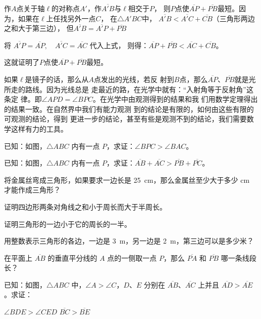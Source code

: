 \begin{solution}
    作$A$点关于轴$\ell$的对称点$A'$，作$\overline{A'B}$与$\ell$相交于$P$，
    则$P$点使$\overline{AP}+\overline{PB}$最短。因为，如果在$\ell$上任找另外一点$C$，
    在$\triangle A'BC$中，
    $\overline{A'B}<\overline{A'C}+\overline{CB}$（三角形两边之和大于第三边），
    但$\overline{A'B}=\overline{A'P}+\overline{PB}$

将    $\overline{A'P}=\overline{AP},\quad \overline{A'C}=\overline{AC}$ 代入上式，
    则得：$\overline{AP}+\overline{PB}<\overline{AC}+\overline{CB}$。

    这就证明了$P$点使$\overline{AP}+\overline{PB}$最短。
\end{solution}

\begin{rmk}
    如果$\ell$是镜子的话，那么从$A$点发出的光线，若反
射到$B$点，那么$\overline{AP}$、$\overline{PB}$就是光所走的路线。因为光线总是
走最近的路，在光学中就有：“入射角等于反射角”这条定
律。即$\angle APD=\angle BPC$。在光学中由观测得到的结果和我
们用数学定理得出的结果一致。在自然界中我们有能力观测
到的结论是有限的，如何由这些有限的可观测的结论，得到
更进一步的结论，甚至有些是观测不到的结论，我们需要数
学这样有力的工具。
\end{rmk}
    
\begin{Practice}
\begin{question}
  \item 已知：如图，$\triangle ABC$ 内有一点 $P$，求证：$\angle BPC>\angle BAC$。
  \item 已知：如图，$\triangle ABC$ 内有一点 $P$，求证：$\overline{AB}+\overline{AC}>\overline{PB}+\overline{PC}$。
  \item 将金属丝弯成三角形，如果要求一边长是 \qty{25}{cm}，那么金属丝至少大于多少 \unit{cm} 才能作成三角形？
  \item 证明四边形两条对角线之和小于周长而大于半周长。
  \item 证明三角形的一边小于它的周长的一半。
  \item 用整数表示三角形的各边，一边是 \qty{3}{m}，另一边是 \qty{2}{m}，第三边可以是多少米？
  \item 在平面上 $\overline{AB}$ 的垂直平分线的 $A$ 点的一侧取一点 $P$，那么 $\overline{PA}$ 和 $\overline{PB}$ 哪一条线段长？
  \item 已知：如图，$\triangle ABC$ 中，$\angle A>\angle C$，$D$、$E$ 分别在 $\overline{AB}$、$\overline{AC}$ 上并且 $\overline{AD}>\overline{AE}$。求证：
  \begin{tasks}
    \task $\angle BDE> \angle CED$
    \task $\overline{BC}>\overline{BE}$
  \end{tasks}
\end{question}
\end{Practice}
    
